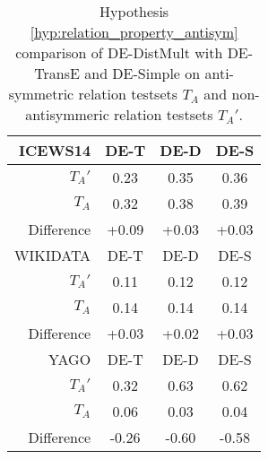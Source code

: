 \begin{table}[htb]
\centering
\begin{minipage}{0.95\columnwidth}
\centering
\caption{Hypothesis \autoref{hyp:relation_property_antisym} comparison of DE-DistMult with DE-TransE and DE-Simple on anti-symmetric relation testsets $T_A$ and non-antisymmeric relation testsets $T_A'$.}
\vspace{-3mm}

\begin{tabular}{r|ccc}\hline
ICEWS14 & DE-T & DE-D & DE-S \\ \hline
$T_A'$ & 0.23 & 0.35 & 0.36 \\
$T_A$ & 0.32 & 0.38 & 0.39 \\ \hline
Difference & +0.09 & +0.03 & +0.03 \\ \hline\hline
WIKIDATA & DE-T & DE-D & DE-S \\ \hline
$T_A'$ & 0.11 & 0.12 & 0.12 \\
$T_A$ & 0.14 & 0.14 & 0.14 \\ \hline
Difference & +0.03 & +0.02 & +0.03 \\ \hline\hline
YAGO & DE-T & DE-D & DE-S \\ \hline
$T_A'$ & 0.32 & 0.63 & 0.62 \\
$T_A$ & 0.06 & 0.03 & 0.04 \\ \hline
Difference & -0.26 & -0.60 & -0.58 \\ \hline
\end{tabular}

\label{tab:hypothesis_3_b_comparison}
\end{minipage}
\end{table}

